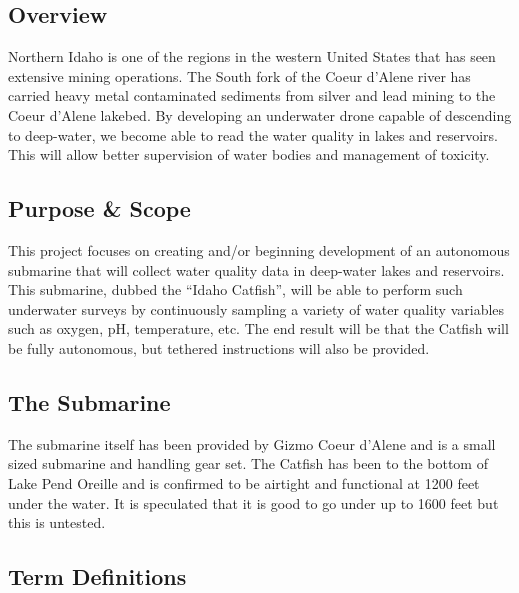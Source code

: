 \documentclass[
18pt, %
a4paper, %
oneside, %
headinclude,footinclude, %
]{scrartcl}
\begin{document}
\subsection*{Overview}

Northern Idaho is one of the regions in the western United States that has seen extensive mining operations. The South fork of the Coeur d’Alene river has carried heavy metal contaminated sediments from silver and lead mining to the Coeur d’Alene lakebed. By developing an underwater drone capable of descending to deep-water, we become able to read the water quality in lakes and reservoirs. This will allow better supervision of water bodies and management of toxicity.

\subsection*{Purpose \& Scope}

This project focuses on creating and/or beginning development of an autonomous submarine that will collect water quality data in deep-water lakes and reservoirs. This submarine, dubbed the “Idaho Catfish”, will be able to perform such underwater surveys by continuously sampling a variety of water quality variables such as oxygen, pH, temperature, etc. The end result will be that the Catfish will be fully autonomous, but tethered instructions will also be provided.

\subsection*{The Submarine}
The submarine itself has been provided by Gizmo Coeur d'Alene and is a small sized submarine and handling gear set. The Catfish has been to the bottom of Lake Pend Oreille and is confirmed to be airtight and functional at 1200 feet under the water. It is speculated that it is good to go under up to 1600 feet but this is untested.

\subsection*{Term Definitions}
\end{document}
